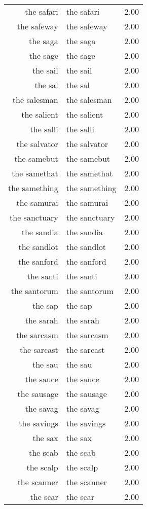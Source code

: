 \begin{table}[ht]
\begin{tabular}{rlr}
  the safari & the safari & 2.00 \\ 
  the safeway & the safeway & 2.00 \\ 
  the saga & the saga & 2.00 \\ 
  the sage & the sage & 2.00 \\ 
  the sail & the sail & 2.00 \\ 
  the sal & the sal & 2.00 \\ 
  the salesman & the salesman & 2.00 \\ 
  the salient & the salient & 2.00 \\ 
  the salli & the salli & 2.00 \\ 
  the salvator & the salvator & 2.00 \\ 
  the samebut & the samebut & 2.00 \\ 
  the samethat & the samethat & 2.00 \\ 
  the samething & the samething & 2.00 \\ 
  the samurai & the samurai & 2.00 \\ 
  the sanctuary & the sanctuary & 2.00 \\ 
  the sandia & the sandia & 2.00 \\ 
  the sandlot & the sandlot & 2.00 \\ 
  the sanford & the sanford & 2.00 \\ 
  the santi & the santi & 2.00 \\ 
  the santorum & the santorum & 2.00 \\ 
  the sap & the sap & 2.00 \\ 
  the sarah & the sarah & 2.00 \\ 
  the sarcasm & the sarcasm & 2.00 \\ 
  the sarcast & the sarcast & 2.00 \\ 
  the sau & the sau & 2.00 \\ 
  the sauce & the sauce & 2.00 \\ 
  the sausage & the sausage & 2.00 \\ 
  the savag & the savag & 2.00 \\ 
  the savings & the savings & 2.00 \\ 
  the sax & the sax & 2.00 \\ 
  the scab & the scab & 2.00 \\ 
  the scalp & the scalp & 2.00 \\ 
  the scanner & the scanner & 2.00 \\ 
  the scar & the scar & 2.00 \\ 

\end{tabular}
\end{table}
